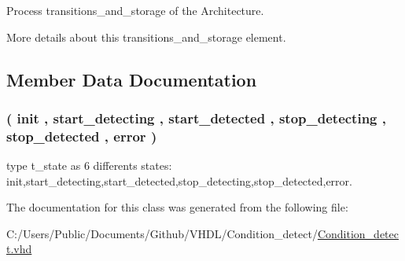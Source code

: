 Process transitions\+\_\+and\+\_\+storage of the Architecture. 

More details about this transitions\+\_\+and\+\_\+storage element. 

\subsection{Member Data Documentation}
\subsubsection[{\texorpdfstring{t\+\_\+state}{t_state}}]{ {\bfseries \textcolor{vhdlchar}{(}\textcolor{vhdlchar}{ }\textcolor{vhdlchar}{init}\textcolor{vhdlchar}{ }\textcolor{vhdlchar}{,}\textcolor{vhdlchar}{ }\textcolor{vhdlchar}{start\+\_\+detecting}\textcolor{vhdlchar}{ }\textcolor{vhdlchar}{,}\textcolor{vhdlchar}{ }\textcolor{vhdlchar}{start\+\_\+detected}\textcolor{vhdlchar}{ }\textcolor{vhdlchar}{,}\textcolor{vhdlchar}{ }\textcolor{vhdlchar}{stop\+\_\+detecting}\textcolor{vhdlchar}{ }\textcolor{vhdlchar}{,}\textcolor{vhdlchar}{ }\textcolor{vhdlchar}{stop\+\_\+detected}\textcolor{vhdlchar}{ }\textcolor{vhdlchar}{,}\textcolor{vhdlchar}{ }\textcolor{vhdlchar}{error}\textcolor{vhdlchar}{ }\textcolor{vhdlchar}{)}\textcolor{vhdlchar}{ }} \hspace{0.3cm}{\ttfamily [Type]}}\hypertarget{class_condition__detect_1_1fsm_af1aa411452cee18437e460b9d30ed364}{}\label{class_condition__detect_1_1fsm_af1aa411452cee18437e460b9d30ed364}
type t\+\_\+state as 6 differents states\+: init,start\+\_\+detecting,start\+\_\+detected,stop\+\_\+detecting,stop\+\_\+detected,error. 

The documentation for this class was generated from the following file\+:\begin{DoxyCompactItemize}
\item 
C\+:/\+Users/\+Public/\+Documents/\+Github/\+V\+H\+D\+L/\+Condition\+\_\+detect/\hyperlink{_condition__detect_8vhd}{Condition\+\_\+detect.\+vhd}\end{DoxyCompactItemize}
